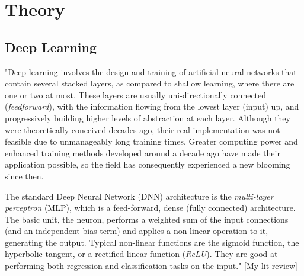 \chapter{Theory} \label{Chapter: Theory}




\section{Deep Learning}

"Deep learning involves the design and training of artificial neural networks that contain several stacked layers, as compared to shallow learning, where there are one or two at most. These layers are usually uni-directionally connected (\textit{feedforward}), with the information flowing from the lowest layer (input) up, and progressively building higher levels of abstraction at each layer. Although they were theoretically conceived decades ago, their real implementation was not feasible due to unmanageably long training times. Greater computing power and enhanced training methods developed around a decade ago have made their application possible, so the field has consequently experienced a new blooming since then.

The standard Deep Neural Network (DNN) architecture is the \textit{multi-layer perceptron} (MLP), which is a feed-forward, dense (fully connected) architecture. The basic unit, the neuron, performs a weighted sum of the input connections (and an independent bias term) and applies a non-linear operation to it, generating the output. Typical non-linear functions are the sigmoid function, the hyperbolic tangent, or a rectified linear function (\textit{ReLU}). They are good at performing both regression and classification tasks on the input." [My lit review]

